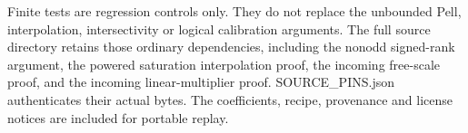 Finite tests are regression controls only. They do not replace the unbounded Pell, interpolation, intersectivity or logical calibration arguments. The full source directory retains those ordinary dependencies, including the nonodd signed-rank argument, the powered saturation interpolation proof, the incoming free-scale proof, and the incoming linear-multiplier proof. SOURCE\_\allowbreak{}PINS.json authenticates their actual bytes. The coefficients, recipe, provenance and license notices are included for portable replay.
